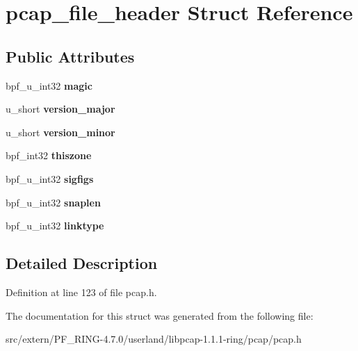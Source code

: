 \hypertarget{structpcap__file__header}{
\section{pcap\_\-file\_\-header Struct Reference}
\label{structpcap__file__header}
}
\subsection*{Public Attributes}
\begin{DoxyCompactItemize}
\item 
\hypertarget{structpcap__file__header_a62fabd6915adfc3530c6e8eb460f2681}{
bpf\_\-u\_\-int32 {\bfseries magic}}
\label{structpcap__file__header_a62fabd6915adfc3530c6e8eb460f2681}

\item 
\hypertarget{structpcap__file__header_ae8c0e53c03fb93b23432187e8c24f041}{
u\_\-short {\bfseries version\_\-major}}
\label{structpcap__file__header_ae8c0e53c03fb93b23432187e8c24f041}

\item 
\hypertarget{structpcap__file__header_ab6ccf125bd6fd40f98aaf25e2d294e35}{
u\_\-short {\bfseries version\_\-minor}}
\label{structpcap__file__header_ab6ccf125bd6fd40f98aaf25e2d294e35}

\item 
\hypertarget{structpcap__file__header_a7edcce9948a4d8eca478a808dc6f2584}{
bpf\_\-int32 {\bfseries thiszone}}
\label{structpcap__file__header_a7edcce9948a4d8eca478a808dc6f2584}

\item 
\hypertarget{structpcap__file__header_a253b2d5f641757e2d2442fbc26d47c17}{
bpf\_\-u\_\-int32 {\bfseries sigfigs}}
\label{structpcap__file__header_a253b2d5f641757e2d2442fbc26d47c17}

\item 
\hypertarget{structpcap__file__header_a73f00c9f1df5b28dee39bb57a865396c}{
bpf\_\-u\_\-int32 {\bfseries snaplen}}
\label{structpcap__file__header_a73f00c9f1df5b28dee39bb57a865396c}

\item 
\hypertarget{structpcap__file__header_a61ed7bf000606aac0afbd441b83f37bf}{
bpf\_\-u\_\-int32 {\bfseries linktype}}
\label{structpcap__file__header_a61ed7bf000606aac0afbd441b83f37bf}

\end{DoxyCompactItemize}


\subsection{Detailed Description}


Definition at line 123 of file pcap.h.



The documentation for this struct was generated from the following file:\begin{DoxyCompactItemize}
\item 
src/extern/PF\_\-RING-\/4.7.0/userland/libpcap-\/1.1.1-\/ring/pcap/pcap.h\end{DoxyCompactItemize}
